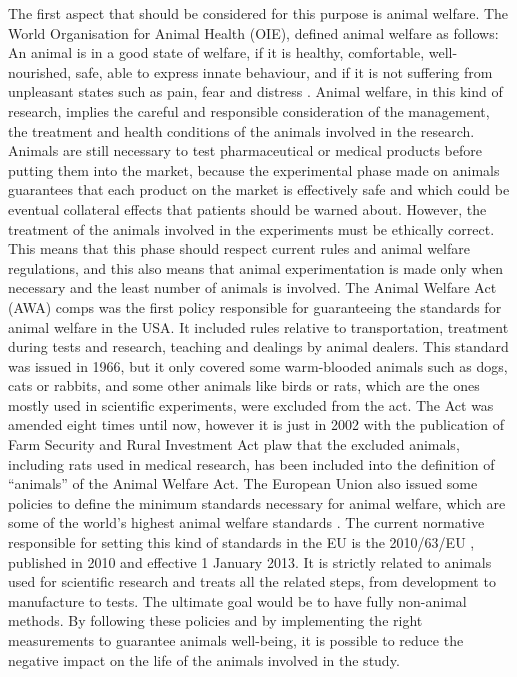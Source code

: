 \documentclass{Configuration_Files/PoliMi3i_thesis}
\begin{document}
The first aspect that should be considered for this purpose is animal welfare. The World Organisation for Animal Health (OIE), defined animal welfare as follows: An animal is in a good state of welfare, if it is healthy, comfortable, well-nourished, safe, able to express innate behaviour, and if it is not suffering from unpleasant states such as pain, fear and distress \cite{Chapter}. Animal welfare, in this kind of research, implies the careful and responsible consideration of the management, the treatment and health conditions of the animals involved in the research.
Animals are still necessary to test pharmaceutical or medical products before putting them into the market, because the experimental phase made on animals guarantees that each product on the market is effectively safe and which could be eventual collateral effects that patients should be warned about. However, the treatment of the animals involved in the experiments must be ethically correct. This means that this phase should respect current rules and animal welfare regulations, and this also means that animal experimentation is made only when necessary and the least number of animals is involved. 
The Animal Welfare Act (AWA) \cite{}comps was the first policy responsible for guaranteeing the standards for animal welfare in the USA. It included rules relative to transportation, treatment during tests and research, teaching and dealings by animal dealers. This standard was issued in 1966, but it only covered some warm-blooded animals such as dogs, cats or rabbits, and some other animals like birds or rats, which are the ones mostly used in scientific experiments, were excluded from the act. The Act was amended eight times until now, however it is just in 2002 with the publication of Farm Security and Rural Investment Act \cite{}plaw that the excluded animals, including rats used in medical research, has been included into the definition of “animals” of the Animal Welfare Act.
The European Union also issued some policies to define the minimum standards necessary for animal welfare, which are some of the world’s highest animal welfare standards \cite{AnimalWelfareEU}. The current normative responsible for setting this kind of standards in the EU is the 2010/63/EU \cite{Direttiva201063}, published in 2010 and effective 1 January 2013. It is strictly related to animals used for scientific research and treats all the related steps, from development to manufacture to tests. The ultimate goal would be to have fully non-animal methods.
By following these policies and by implementing the right measurements to guarantee animals well-being, it is possible to reduce the negative impact on the life of the animals involved in the study.
\end{document}
